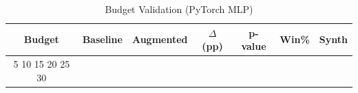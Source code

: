 \begin{table}[htbp]
\centering
\caption{Budget Validation (PyTorch MLP)}
\label{tab:pytorch_budget}
\begin{tabular}{ccccccc}
\toprule
Budget & Baseline & Augmented & $\Delta$ (pp) & p-value & Win\% & Synth \\
\midrule
5%
10%
15%
20%
25%
30%
\bottomrule
\end{tabular}
\end{table}